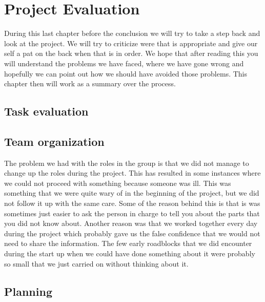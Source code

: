 \section{Project Evaluation}\label{Project Evaluation}
    During this last chapter before the conclusion we will try to take a step back and look at the project. We will try to criticize were that is appropriate and give our self a pat on the back when that is in order. We hope that after reading this you will understand the problems we have faced, where we have gone wrong and hopefully we can point out how we should have avoided those problems. This chapter then will work as a summary over the process.
    
    \subsection{Task evaluation}
    
    \subsection{Team organization}
        The problem we had with the roles in the group is that we did not manage to change up the roles during the project. This has resulted in some instances where we could not proceed with something because someone was ill. This was something that we were quite wary of in the beginning of the project, but we did not follow it up with the same care. Some of the reason behind this is that is was sometimes just easier to ask the person in charge to tell you about the parts that you did not know about. Another reason was that we worked together every day during the project which probably gave us the false confidence that we would not need to share the information. The few early roadblocks that we did encounter during the start up when we could have done something about it were probably so small that we just carried on without thinking about it. 
    \subsection{Planning}

